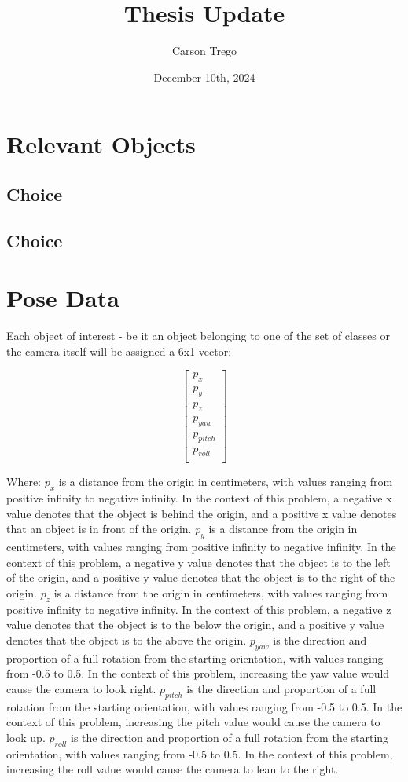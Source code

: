 \documentclass{article}
\title{Thesis Update}
\author{Carson Trego}
\date{December 10th, 2024}
\begin{document}
\maketitle

\section{Relevant Objects}
\subsection{Choice}
\subsection{Choice}

\section{Pose Data}
Each object of interest - be it an object belonging to one of the set of classes or the camera itself will be assigned a 6x1 vector: 

\[
\begin{bmatrix}
    p_{x} \\
    p_{y} \\
    p_{z} \\
    p_{yaw} \\
    p_{pitch} \\
    p_{roll} \\
\end{bmatrix}
\]

Where: 
$p_{x}$ is a distance from the origin in centimeters, with values ranging from positive infinity to negative infinity. In the context of this problem, a negative x value denotes that the object is behind the origin, and a positive x value denotes that an object is in front of the origin.
$p_{y}$ is a distance from the origin in centimeters, with values ranging from positive infinity to negative infinity. In the context of this problem, a negative y value denotes that the object is to the left of the origin, and a positive y value denotes that the object is to the right of the origin.
$p_{z}$ is a distance from the origin in centimeters, with values ranging from positive infinity to negative infinity. In the context of this problem, a negative z value denotes that the object is to the below the origin, and a positive y value denotes that the object is to the above the origin.
$p_{yaw}$ is the direction and proportion of a full rotation from the starting orientation, with values ranging from -0.5 to 0.5. In the context of this problem, increasing the yaw value would cause the camera to look right.
$p_{pitch}$ is the direction and proportion of a full rotation from the starting orientation, with values ranging from -0.5 to 0.5. In the context of this problem, increasing the pitch value would cause the camera to look up.
$p_{roll}$ is the direction and proportion of a full rotation from the starting orientation, with values ranging from -0.5 to 0.5. In the context of this problem, increasing the roll value would cause the camera to lean to the right.
\end{document}
